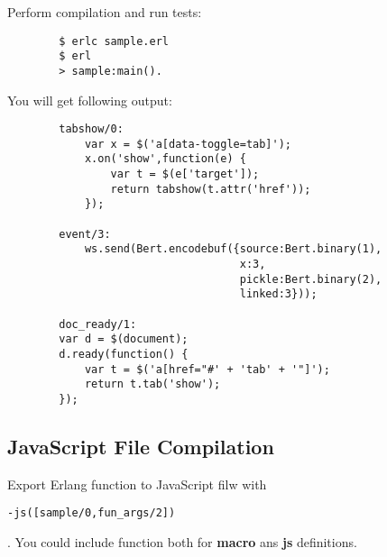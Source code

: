 \newpage
Perform compilation and run tests:

\vspace{1\baselineskip}
\begin{lstlisting}
        $ erlc sample.erl
        $ erl
        > sample:main().
\end{lstlisting}
\vspace{1\baselineskip}

You will get following output:

\vspace{1\baselineskip}
\begin{lstlisting}
        tabshow/0:
            var x = $('a[data-toggle=tab]');
            x.on('show',function(e) {
                var t = $(e['target']);
                return tabshow(t.attr('href'));
            });

        event/3:
            ws.send(Bert.encodebuf({source:Bert.binary(1),
                                    x:3,
                                    pickle:Bert.binary(2),
                                    linked:3}));

        doc_ready/1:
        var d = $(document);
        d.ready(function() {
            var t = $('a[href="#' + 'tab' + '"]');
            return t.tab('show');
        });
\end{lstlisting}
\vspace{1\baselineskip}

\subsection{JavaScript File Compilation}
Export Erlang function to JavaScript filw with \begin{verbatim}-js([sample/0,fun_args/2])\end{verbatim}.
You could include function both for {\bf macro} ans {\bf js} definitions.

